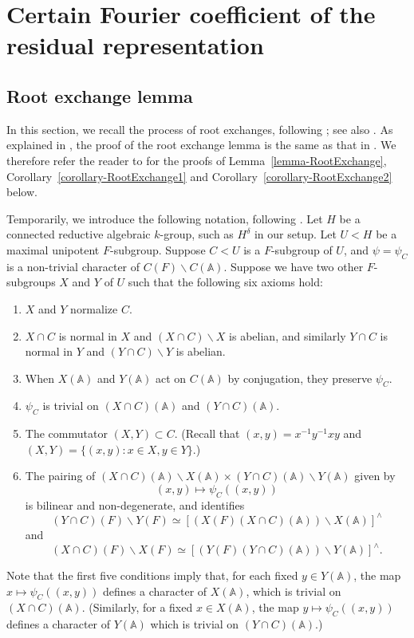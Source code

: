 \documentclass[12pt]{amsart}
\newcommand{\A}{\mathbb{A}}
\theoremstyle{remark}
\newcommand{\bs}{\backslash}
\begin{document}
\section{Certain Fourier coefficient of the residual representation}
\label{section-certain-fourier-coef}
\subsection{Root exchange lemma}

In this section, we recall the process of root exchanges, following \cite[\S 7.1]{GinzburgRallisSoudry2011}; see also \cite[\S 6.1]{AsgariCogdellShahidi2024}. As explained in \cite[\S 6.1]{AsgariCogdellShahidi2024}, the proof of the root exchange lemma is the same as that in \cite[\S 7.1]{GinzburgRallisSoudry2011}. We therefore refer the reader to \cite[\S 7.1]{GinzburgRallisSoudry2011} for the proofs of Lemma~\ref{lemma-RootExchange}, Corollary~\ref{corollary-RootExchange1} and Corollary~\ref{corollary-RootExchange2} below. 

Temporarily, we introduce the following notation, following \cite[\S 6.1]{AsgariCogdellShahidi2024}.
Let $H$ be a  connected reductive algebraic $k$-group, such as $H^\delta$ in our setup. 
Let $U<H$ be a maximal unipotent $F$-subgroup.  Suppose $C<U$ is a $F$-subgroup of $U$, and $\psi=\psi_C$ is a non-trivial character 
of $C(F)\bs C(\A)$.  Suppose we have two other $F$-subgroups $X$ and $Y$ of $U$ such that the following six axioms hold:
\begin{enumerate}
\item $X$ and $Y$ normalize $C$. 
\item $X\cap C$ is normal in $X$ and $(X\cap C)\bs X$ is abelian, and similarly $Y\cap C$ is normal in $Y$ and $(Y\cap C)\bs Y$ is abelian. 
\item When $X(\A)$ and $Y(\A)$ act on $C(\A)$ by conjugation, they preserve $\psi_C$. 
\item $\psi_C$ is trivial on $(X\cap C)(\A)$ and $(Y\cap C)(\A)$. 
\item The commutator $(X,Y)\subset C$. (Recall that $(x,y)=x^{-1}y^{-1}xy$ and $(X,Y)=\{(x,y):x\in X, y\in Y\}$.)
\item The pairing of $(X\cap C)(\A)\bs X(\A) \times (Y\cap C)(\A)\bs Y(\A)$ given by 
$$(x,y)\mapsto \psi_C((x,y))$$ is bilinear and non-degenerate, and identifies 
\begin{equation*}
(Y\cap C)(F)\bs Y(F)\simeq \left[(X(F)(X\cap C)(\A))\bs X(\A)\right]^{\wedge}  
\end{equation*} 
and 
\begin{equation*}
(X\cap C)(F)\bs X(F)\simeq \left[(Y(F)(Y\cap C)(\A))\bs Y(\A)\right]^\wedge.
\end{equation*} 
\end{enumerate}
Note that the first five conditions imply that, for each fixed $y\in Y(\A)$, the map $x\mapsto \psi_C((x,y))$ defines a character of 
$X(\A)$, which is trivial on $(X\cap C)(\A)$. (Similarly, for a fixed $x\in X(\A)$, the map $y\mapsto \psi_C((x,y))$ defines a character of $Y(\A)$ 
which is trivial on $(Y\cap C)(\A)$.)
\end{document}
